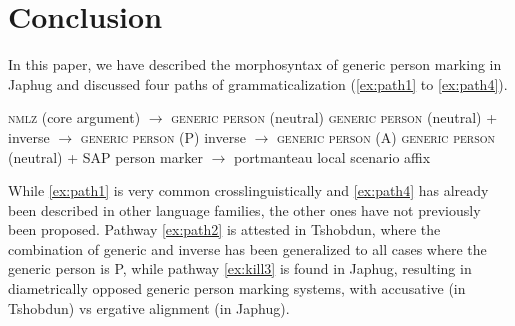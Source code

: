 \documentclass[oldfontcommands,oneside,a4paper,11pt]{article}
\begin{document}
\section{Conclusion}
In this paper, we have described the morphosyntax of generic person marking in Japhug and discussed four paths of grammaticalization (\ref{ex:path1} to \ref{ex:path4}).


\begin{exe}
\ex \label{ex:path1}
\glt  \textsc{nmlz} (core argument) $\rightarrow$ \textsc{generic person} (neutral)
\ex \label{ex:path2}
\glt  \textsc{generic person} (neutral) + inverse  $\rightarrow$ \textsc{generic person} (P)
\ex \label{ex:path3}
\glt inverse  $\rightarrow$ \textsc{generic person} (A)
\ex \label{ex:path4}
\glt  \textsc{generic person} (neutral) + SAP person marker  $\rightarrow$ portmanteau local scenario affix
\end{exe}

While \ref{ex:path1} is very common crosslinguistically and \ref{ex:path4} has already been described in other language families, the other ones have not previously been proposed. Pathway \ref{ex:path2} is attested in Tshobdun, where the combination of generic and inverse has been generalized to all cases where the generic person is P, while pathway \ref{ex:kill3} is found in Japhug, resulting in diametrically opposed generic person marking systems, with accusative (in Tshobdun) vs ergative alignment (in Japhug).



\end{document}
